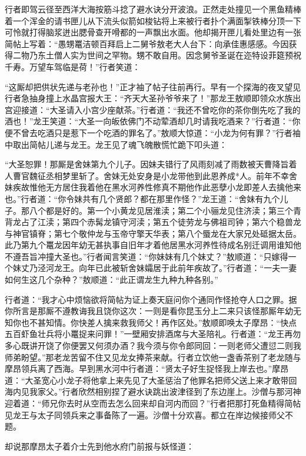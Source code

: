 \documentclass[12pt,UTF8]{ctexbook}
\begin{document}
行者即驾云径至西洋大海按筋斗捻了避水诀分开波浪。正然走处撞见一个黑鱼精棒着一个浑金的请书匣儿从下流头似箭如梭钻将上来被行者扑个满面掣铁棒分顶一下可怜就打得脑浆迸出腮骨查开嗗都的一声飘出水面。他却揭开匣儿看处里边有一张简帖上写着：“愚甥鼍洁顿百拜启上二舅爷敖老大人台下：向承佳惠感感。今因获得二物乃东土僧人实为世间之罕物。甥不敢自用。因念舅爷圣诞在迩特设菲筵预祝千寿。万望车驾临是荷！”行者笑道：

“这厮却把供状先递与老孙也！”正才袖了帖子往前再行。早有一个探海的夜叉望见行者急抽身撞上水晶宫报大王：“齐天大圣孙爷爷来了！”那龙王敖顺即领众水族出宫迎接道：“大圣请入小宫少座献茶。”行者道：“我还不曾吃你的茶你倒先吃了我的酒也！”龙王笑道：“大圣一向皈依佛门不动荤酒却几时请我吃酒来？”行者道：“你便不曾去吃酒只是惹下一个吃酒的罪名了。”敖顺大惊道：“小龙为何有罪？”行者袖中取出简帖儿递与龙王。龙王见了魂飞魄散慌忙跪下叩头道：

“大圣恕罪！那厮是舍妹第九个儿子。因妹夫错行了风雨刻减了雨数被天曹降旨着人曹官魏征丞相梦里斩了。舍妹无处安身是小龙带他到此恩养成*人。前年不幸舍妹疾故惟他无方居住我着他在黑水河养性修真不期他作此恶孽小龙即差人去擒他来也。”行者道：“你令妹共有几个贤郎？都在那里作怪？”龙王道：“舍妹有九个儿子。那八个都是好的。第一个小黄龙见居淮渎；第二个小骊龙见住济渎；第三个青背龙占了江渎；第四个赤髯龙镇守河渎；第五个徒劳龙与佛祖司钟；第六个稳兽龙与神官镇脊；第七个敬仲龙与玉帝守擎天华表；第八个蜃龙在大家兄处砥据太岳。此乃第九个鼍龙因年幼无甚执事自旧年才着他居黑水河养性待成名别迁调用谁知他不遵吾旨冲撞大圣也。”行者闻言笑道：“你妹妹有几个妹丈？”敖顺道：“只嫁得一个妹丈乃泾河龙王。向年已此被斩舍妹孀居于此前年疾故了。”行者道：“一夫一妻如何生这几个杂种？”敖顺道：“此正谓龙生九种九种各别。”

行者道：“我才心中烦恼欲将简帖为证上奏天庭问你个通同作怪抢夺人口之罪。据你所言是那厮不遵教诲我且饶你这次：一则是看你昆玉分上二来只该怪那厮年幼无知你也不甚知情。你快差人擒来救我师父！再作区处。”敖顺即唤太子摩昂：“快点五百虾鱼壮兵将小鼍捉来问罪！”一壁厢安排酒席与大圣陪礼。行者道：“龙王再勿多心既讲开饶了你便罢又何须办酒？我今须与你令郎同回：一则老师父遭愆二则我师弟盼望。”那老龙苦留不住又见龙女捧茶来献。行者立饮他一盏香茶别了老龙随与摩昂领兵离了西海。早到黑水河中行者道：“贤太子好生捉怪我上岸去也。”摩昂道：“大圣宽心小龙子将他拿上来先见了大圣惩治了他罪名把师父送上来才敢带回海内见我家父。”行者欣然相别捏了避水诀跳出波津径到了东边崖上。沙僧与那河神迎着道：“师兄你去时从空而去怎么回来却自河内而回？”行者把那打死鱼精得简帖见龙王与太子同领兵来之事备陈了一遍。沙僧十分欢喜。都立在岸边候接师父不题。

却说那摩昂太子着介士先到他水府门前报与妖怪道：
\end{document}
